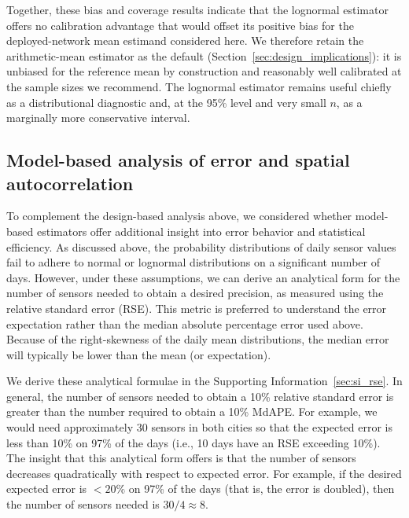 \documentclass[12pt]{article}
\theoremstyle{remark}
\begin{document}
Together, these bias and coverage results indicate that the lognormal estimator offers no calibration advantage that would offset its positive bias for the deployed-network mean estimand considered here. We therefore retain the arithmetic-mean estimator as the default (Section~\ref{sec:design_implications}): it is unbiased for the reference mean by construction and reasonably well calibrated at the sample sizes we recommend. The lognormal estimator remains useful chiefly as a distributional diagnostic and, at the 95\% level and very small $n$, as a marginally more conservative interval.




\subsection{Model-based analysis of error and spatial autocorrelation}
\label{sec:analytical_considerations}
To complement the design-based analysis above, we considered whether model-based estimators offer additional insight into error behavior and statistical efficiency. As discussed above, the probability distributions of daily sensor values fail to adhere to normal or lognormal distributions on a significant number of days. However, under these assumptions, we can derive an analytical form for the number of sensors needed to obtain a desired precision, as measured using the relative standard error (RSE). This metric is preferred to understand the error expectation rather than the median absolute percentage error used above. Because of the right-skewness of the daily mean distributions, the median error will typically be lower than the mean (or expectation).

We derive these analytical formulae in the Supporting Information~\ref{sec:si_rse}. In general, the number of sensors needed to obtain a 10\% relative standard error is greater than the number required to obtain a 10\% MdAPE. For example, we would need approximately 30 sensors in both cities so that the expected error is less than 10\% on 97\% of the days (i.e., 10 days have an RSE exceeding 10\%). The insight that this analytical form offers is that the number of sensors decreases quadratically with respect to expected error. For example, if the desired expected error is $<20\%$ on 97\% of the days (that is, the error is doubled), then the number of sensors needed is $30/4\approx 8$.
\end{document}
